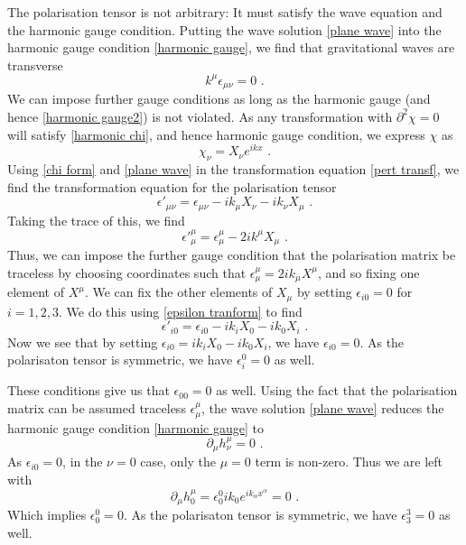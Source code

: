 \documentclass[12pt,twoside,a4paper]{report}
\newcommand{\mn}{_{\mu\nu}}
\newcommand{\fs}{\text{ .}}
\begin{document}
The polarisation tensor is not arbitrary: It must satisfy the wave equation and the harmonic gauge condition. Putting the wave solution \ref{plane wave} into the harmonic gauge condition \ref{harmonic gauge}, we find that gravitational waves are transverse
\begin{equation} \label{harmonic gauge2}
k^\mu \epsilon\mn = 0 \fs
\end{equation}
We can impose further gauge conditions as long as the harmonic gauge (and hence \ref{harmonic gauge2}) is not violated. As any transformation with $\partial^2 \chi = 0$ will satisfy \ref{harmonic chi}, and hence harmonic gauge condition, we express $\chi$ as 
\begin{equation} \label{chi form}
\chi_\nu = X_\nu e^{ikx} \fs
\end{equation}
Using \ref{chi form} and \ref{plane wave} in the transformation equation \ref{pert transf}, we find the transformation equation for the polarisation tensor
\begin{equation} \label{epsilon tranform}
\epsilon'\mn = \epsilon\mn -ik_\mu X_\nu - ik_\nu X_\mu \fs
\end{equation}
Taking the trace of this, we find
\begin{equation}
\epsilon'^\mu_\mu = \epsilon^\mu_\mu - 2ik^\mu X_\mu \fs
\end{equation}
Thus, we can impose the further gauge condition that the polarisation matrix be traceless by choosing coordinates such that $\epsilon^\mu_\mu = 2ik_\mu X^\mu$, and so fixing one element of $X^\mu$. We can fix the other elements of $X_\mu$ by setting $\epsilon_{i 0} = 0$ for $i=1,2,3$. We do this using \ref{epsilon tranform} to find
\begin{equation} \label{epsilon 0}
\epsilon'_{i 0} = \epsilon_{i 0} -ik_i X_0 - ik_0 X_i \fs
\end{equation}
Now we see that by setting $ \epsilon_{i 0} = ik_i X_0 - ik_0 X_i$, we have $\epsilon_{i 0} = 0$. As the polarisaton tensor is symmetric, we have $\epsilon^0_i=0$ as well.

These conditions give us that $\epsilon_{0 0} = 0$ as well. Using the fact that the polarisation matrix can be assumed traceless $\epsilon^\mu_\mu$, the wave solution \ref{plane wave} reduces the harmonic gauge condition \ref{harmonic gauge} to 
\begin{equation}
\partial_\mu h^\mu_\nu = 0 \fs
\end{equation}
As $\epsilon_{i 0} = 0$, in the $\nu = 0$ case, only the $\mu=0$ term is non-zero. Thus we are left with
\begin{equation}
\partial_\mu h^\mu_0 = \epsilon^0_0 i k_0 e^{ik_\alpha x^\alpha} = 0 \fs
\end{equation}
Which implies $\epsilon^0_0=0$. As the polarisaton tensor is symmetric, we have $\epsilon^3_3=0$ as well.  
\end{document}
